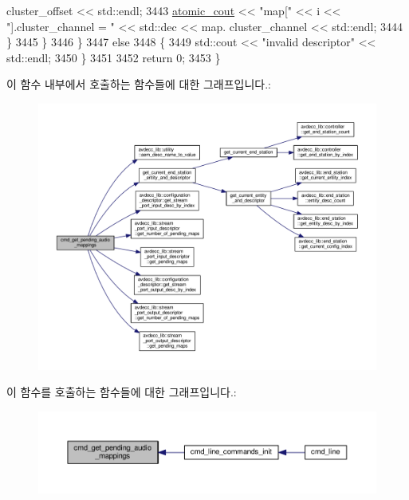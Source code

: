 \begin{DoxyCode}
      cluster\_offset << std::endl;
3443                 \hyperlink{cmd__line_8h_a0bc38ccc65c79ba06c6fcd7b4bf554c3}{atomic\_cout} << \textcolor{stringliteral}{"map["} << i << \textcolor{stringliteral}{"].cluster\_channel = "} << std::dec << map.
      cluster\_channel << std::endl;
3444             \}
3445         \}
3446     \}
3447     \textcolor{keywordflow}{else}
3448     \{
3449         std::cout << \textcolor{stringliteral}{"invalid descriptor"} << std::endl;
3450     \}
3451 
3452     \textcolor{keywordflow}{return} 0;
3453 \}
\end{DoxyCode}


이 함수 내부에서 호출하는 함수들에 대한 그래프입니다.\+:
\nopagebreak
\begin{figure}[H]
\begin{center}
\leavevmode
\includegraphics[width=350pt]{classcmd__line_a7e54e68c1ece07bc4c6e8da442a74289_cgraph}
\end{center}
\end{figure}




이 함수를 호출하는 함수들에 대한 그래프입니다.\+:
\nopagebreak
\begin{figure}[H]
\begin{center}
\leavevmode
\includegraphics[width=350pt]{classcmd__line_a7e54e68c1ece07bc4c6e8da442a74289_icgraph}
\end{center}
\end{figure}


